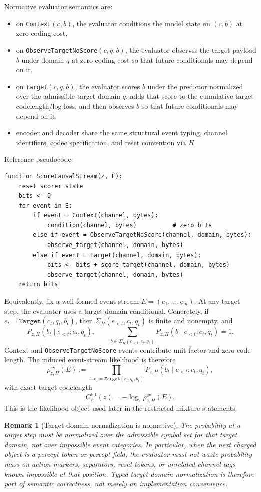 \documentclass[11pt]{article}
\newtheorem{remark}{Remark}
\begin{document}
Normative evaluator semantics are:
\begin{itemize}
    \item on \texttt{Context}$(c,b)$, the evaluator conditions the model state
    on $(c,b)$ at zero coding cost,
    \item on \texttt{ObserveTargetNoScore}$(c,q,b)$, the evaluator observes the
    target payload $b$ under domain $q$ at zero coding cost so that future
    conditionals may depend on it,
    \item on \texttt{Target}$(c,q,b)$, the evaluator scores $b$ under the
    predictor normalized over the admissible target domain $q$, adds that score
    to the cumulative target codelength/log-loss, and then observes $b$ so that
    future conditionals may depend on it,
    \item encoder and decoder share the same structural event typing, channel
    identifiers, codec specification, and reset convention via $H$.
\end{itemize}

Reference pseudocode:
\begin{verbatim}
function ScoreCausalStream(z, E):
    reset scorer state
    bits <- 0
    for event in E:
        if event = Context(channel, bytes):
            condition(channel, bytes)          # zero bits
        else if event = ObserveTargetNoScore(channel, domain, bytes):
            observe_target(channel, domain, bytes)
        else if event = Target(channel, domain, bytes):
            bits <- bits + score_target(channel, domain, bytes)
            observe_target(channel, domain, bytes)
    return bits
\end{verbatim}

Equivalently, fix a well-formed event stream $E=(e_1,\dots,e_m)$. At any
target step, the evaluator uses a target-domain conditional. Concretely, if
$e_t=\texttt{Target}(c_t,q_t,b_t)$, then
$\Sigma_H(e_{<t},c_t,q_t)$ is finite and nonempty, and
\[
P_{z,H}(b_t\mid e_{<t};c_t,q_t),
\qquad
\sum_{b\in\Sigma_H(e_{<t},c_t,q_t)}
P_{z,H}(b\mid e_{<t};c_t,q_t)=1.
\]
Context and \texttt{ObserveTargetNoScore} events contribute unit factor and
zero code length. The induced
event-stream likelihood is therefore
\[
\rho_{z,H}^{\mathrm{ev}}(E)
:=
\prod_{t:\,e_t=\texttt{Target}(c_t,q_t,b_t)}
P_{z,H}(b_t\mid e_{<t};c_t,q_t),
\]
with exact target codelength
\[
C_E^{\mathrm{bit}}(z)=-\log_2 \rho_{z,H}^{\mathrm{ev}}(E).
\]
This is the likelihood object used later in the restricted-mixture statements.

\begin{remark}[Target-domain normalization is normative]
The probability at a target step must be normalized over the admissible symbol
set for that target domain, not over impossible event categories. In
particular, when the next charged object is a percept token or percept field,
the evaluator must not waste probability mass on action markers, separators,
reset tokens, or unrelated channel tags known impossible at that position.
Typed target-domain normalization is therefore part of semantic correctness,
not merely an implementation convenience.
\end{remark}
\end{document}
